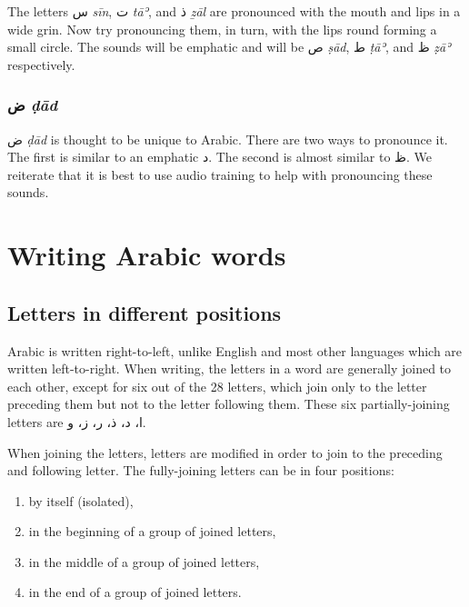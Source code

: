 \documentclass[
  10pt,
]{book}
\providecommand{\tightlist}{%
  \setlength{\itemsep}{0pt}\setlength{\parskip}{0pt}}
\begin{document}
The letters \foreignlanguage{arabic}{س} \emph{sīn}, \foreignlanguage{arabic}{ت} \emph{tāʾ}, and \foreignlanguage{arabic}{ذ} \emph{ẕāl} are pronounced with the mouth and lips in a wide grin. Now try pronouncing them, in turn, with the lips round forming a small circle. The sounds will be emphatic and will be \foreignlanguage{arabic}{ص} \emph{ṣād}, \foreignlanguage{arabic}{ط} \emph{ṭāʾ}, and \foreignlanguage{arabic}{ظ} \emph{ẓāʾ} respectively.

\subsubsection{\texorpdfstring{\foreignlanguage{arabic}{ض} \emph{ḍād}}{ض ḍād}}\label{ux636-dad}

\foreignlanguage{arabic}{ض} \emph{ḍād} is thought to be unique to Arabic. There are two ways to pronounce it. The first is similar to an emphatic \foreignlanguage{arabic}{د}. The second is almost similar to \foreignlanguage{arabic}{ظ}. We reiterate that it is best to use audio training to help with pronouncing these sounds.

\section{Writing Arabic words}\label{writing-arabic-words}

\subsection{Letters in different positions}\label{letters-in-different-positions}

Arabic is written right-to-left, unlike English and most other languages which are written left-to-right. When writing, the letters in a word are generally joined to each other, except for six out of the 28 letters, which join only to the letter preceding them but not to the letter following them. These six partially-joining letters are \foreignlanguage{arabic}{ا، د، ذ، ر، ز، و}.

When joining the letters, letters are modified in order to join to the preceding and following letter. The fully-joining letters can be in four positions:

\begin{enumerate}
\def\labelenumi{\arabic{enumi}.}
\tightlist
\item
  by itself (isolated),
\item
  in the beginning of a group of joined letters,
\item
  in the middle of a group of joined letters,
\item
  in the end of a group of joined letters.
\end{enumerate}
\end{document}
